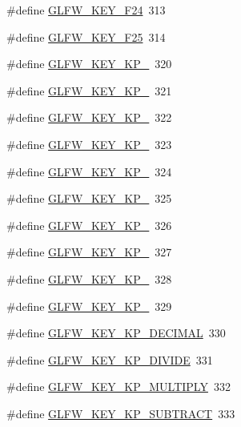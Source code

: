 \begin{DoxyCompactItemize}
\item 
\#define \hyperlink{group__keys_ga8150374677b5bed3043408732152dea2}{G\-L\-F\-W\-\_\-\-K\-E\-Y\-\_\-\-F24}~313
\item 
\#define \hyperlink{group__keys_gaa4bbd93ed73bb4c6ae7d83df880b7199}{G\-L\-F\-W\-\_\-\-K\-E\-Y\-\_\-\-F25}~314
\item 
\#define \hyperlink{group__keys_ga10515dafc55b71e7683f5b4fedd1c70d}{G\-L\-F\-W\-\_\-\-K\-E\-Y\-\_\-\-K\-P\-\_}~320
\item 
\#define \hyperlink{group__keys_gaf3a29a334402c5eaf0b3439edf5587c3}{G\-L\-F\-W\-\_\-\-K\-E\-Y\-\_\-\-K\-P\-\_}~321
\item 
\#define \hyperlink{group__keys_gaf82d5a802ab8213c72653d7480c16f13}{G\-L\-F\-W\-\_\-\-K\-E\-Y\-\_\-\-K\-P\-\_}~322
\item 
\#define \hyperlink{group__keys_ga7e25ff30d56cd512828c1d4ae8d54ef2}{G\-L\-F\-W\-\_\-\-K\-E\-Y\-\_\-\-K\-P\-\_}~323
\item 
\#define \hyperlink{group__keys_gada7ec86778b85e0b4de0beea72234aea}{G\-L\-F\-W\-\_\-\-K\-E\-Y\-\_\-\-K\-P\-\_}~324
\item 
\#define \hyperlink{group__keys_ga9a5be274434866c51738cafbb6d26b45}{G\-L\-F\-W\-\_\-\-K\-E\-Y\-\_\-\-K\-P\-\_}~325
\item 
\#define \hyperlink{group__keys_gafc141b0f8450519084c01092a3157faa}{G\-L\-F\-W\-\_\-\-K\-E\-Y\-\_\-\-K\-P\-\_}~326
\item 
\#define \hyperlink{group__keys_ga8882f411f05d04ec77a9563974bbfa53}{G\-L\-F\-W\-\_\-\-K\-E\-Y\-\_\-\-K\-P\-\_}~327
\item 
\#define \hyperlink{group__keys_gab2ea2e6a12f89d315045af520ac78cec}{G\-L\-F\-W\-\_\-\-K\-E\-Y\-\_\-\-K\-P\-\_}~328
\item 
\#define \hyperlink{group__keys_gafb21426b630ed4fcc084868699ba74c1}{G\-L\-F\-W\-\_\-\-K\-E\-Y\-\_\-\-K\-P\-\_}~329
\item 
\#define \hyperlink{group__keys_ga4e231d968796331a9ea0dbfb98d4005b}{G\-L\-F\-W\-\_\-\-K\-E\-Y\-\_\-\-K\-P\-\_\-\-D\-E\-C\-I\-M\-A\-L}~330
\item 
\#define \hyperlink{group__keys_gabca1733780a273d549129ad0f250d1e5}{G\-L\-F\-W\-\_\-\-K\-E\-Y\-\_\-\-K\-P\-\_\-\-D\-I\-V\-I\-D\-E}~331
\item 
\#define \hyperlink{group__keys_ga9ada267eb0e78ed2ada8701dd24a56ef}{G\-L\-F\-W\-\_\-\-K\-E\-Y\-\_\-\-K\-P\-\_\-\-M\-U\-L\-T\-I\-P\-L\-Y}~332
\item 
\#define \hyperlink{group__keys_gaa3dbd60782ff93d6082a124bce1fa236}{G\-L\-F\-W\-\_\-\-K\-E\-Y\-\_\-\-K\-P\-\_\-\-S\-U\-B\-T\-R\-A\-C\-T}~333

\end{DoxyCompactItemize}
